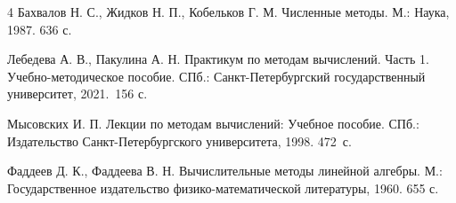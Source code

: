 \documentclass[12pt]{article}
\begin{document}
    \renewcommand{\bibname}{{Список литературы}}
    
    \begin{thebibliography}{4}
    	Бахвалов Н. С., Жидков Н. П., Кобельков Г. М. Численные методы. М.: Наука, 1987. 636 с.
    	
		Лебедева А. В., Пакулина А. Н. Практикум по методам вычислений. Часть 1. Учебно-методическое пособие. СПб.: Санкт-Петербургский государственный университет, 2021.~156 с.
		
		Мысовских И. П. Лекции по методам вычислений: Учебное пособие. СПб.: Издательство Санкт-Петербургского университета, 1998. 472~с.
		
		Фаддеев Д. К., Фаддеева В. Н. Вычислительные методы линейной алгебры. М.:  Государственное издательство физико-математической литературы, 1960. 655 с.
    \end{thebibliography}
\end{document}
